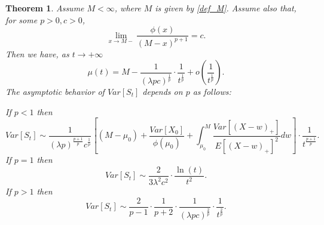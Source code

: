 \documentclass{article}
\newtheorem{thm}{Theorem}[section]
\numberwithin{equation}{section}
\begin{document}
\begin{thm}\label{tep}
Assume 
$M<\infty$, where $M$ is given by \eqref{def_M}.
Assume also that, for some $p>0,c>0$, 
\begin{equation}\label{edge}\lim_{x\rightarrow M-}\frac{\phi(x)}{(M-x)^{p+1}}=c.\end{equation}
Then we have, as $t\rightarrow +\infty$
\begin{equation}\label{ba}\mu(t)=M-\frac{1}{(\lambda pc)^{\frac{1}{p} }}\cdot \frac{1}{t^{\frac{1}{p}}}+o\left( \frac{1}{t^{\frac{1}{p}}}\right) .\end{equation}
The asymptotic behavior of $Var[S_t]$ depends on $p$ as follows:

If $p<1$ then
\begin{equation}\label{p<1}
Var[S_t]\sim \frac{1}{(\lambda p)^{\frac{p+1}{p} }c^{\frac{1}{p}}}\left[(M-\mu_0)+\frac{Var[X_0]}{\phi(\mu_0)}+\int_{\mu_0}^{M}\frac{Var[(X-w)_+]}{E[(X-w)_+]^2}  dw \right]\cdot \frac{1}{t^{\frac{p+1}{p}}}.
\end{equation}
If $p=1$ then
\begin{equation}\label{p=1}
Var[S_t]\sim\frac{2}{3\lambda^2 c^2}\cdot \frac{\ln(t)}{t^2}.
\end{equation}
If $p>1$ then
\begin{equation}\label{p>1}
Var[S_t]\sim\frac{2}{p-1}\cdot \frac{1}{p+2}\cdot \frac{1}{ (\lambda pc)^{\frac{2}{p}}}\cdot \frac{1}{t^{\frac{2}{p}}}.
\end{equation}

\end{thm}
\end{document}
